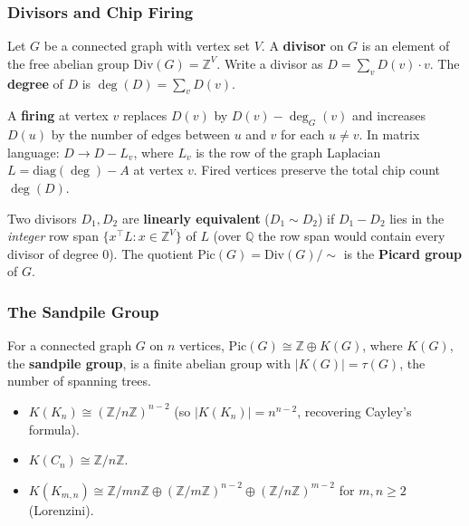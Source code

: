 \subsubsection{Divisors and Chip Firing}

\begin{definition}[Divisor]\label{def:divisor}
Let $G$ be a connected graph with vertex set $V$. A \textbf{divisor}
on $G$ is an element of the free abelian group
$\mathrm{Div}(G) = \mathbb Z^{V}$. Write a divisor as
$D = \sum_v D(v) \cdot v$. The \textbf{degree} of $D$ is
$\deg(D) = \sum_v D(v)$.
\end{definition}

\begin{definition}\label{def:firing}
A \textbf{firing} at vertex $v$ replaces $D(v)$ by $D(v) - \deg_G(v)$
and increases $D(u)$ by the number of edges between $u$ and $v$ for
each $u \ne v$. In matrix language: $D \to D - L_v$, where $L_v$ is
the row of the graph Laplacian $L = \mathrm{diag}(\deg) - A$ at vertex $v$. Fired
vertices preserve the total chip count $\deg(D)$.
\end{definition}

\begin{definition}
Two divisors $D_1, D_2$ are \textbf{linearly equivalent}
($D_1 \sim D_2$) if $D_1 - D_2$ lies in the \emph{integer} row span
$\{x^{\top} L : x \in \mathbb Z^{V}\}$ of $L$ (over $\mathbb Q$ the
row span would contain every divisor of degree $0$). The
quotient $\mathrm{Pic}(G) = \mathrm{Div}(G) / \sim$ is the
\textbf{Picard group} of $G$.
\end{definition}

\subsubsection{The Sandpile Group}

\begin{theorem}\label{thm:sandpile}
For a connected graph $G$ on $n$ vertices,
$\mathrm{Pic}(G) \cong \mathbb Z \oplus K(G)$, where $K(G)$, the
\textbf{sandpile group}, is a finite abelian group with
$|K(G)| = \tau(G)$, the number of spanning trees.
\end{theorem}

\begin{example}
\mbox{}
\begin{itemize}
  \item $K(K_n) \cong (\mathbb Z / n\mathbb Z)^{n - 2}$ (so
        $|K(K_n)| = n^{n - 2}$, recovering Cayley's formula).
  \item $K(C_n) \cong \mathbb Z / n \mathbb Z$.
  \item $K(K_{m, n}) \cong \mathbb Z / mn\mathbb Z \oplus (\mathbb Z / m \mathbb Z)^{n - 2} \oplus (\mathbb Z / n \mathbb Z)^{m - 2}$ for $m, n \ge 2$ (Lorenzini).
\end{itemize}
\end{example}

